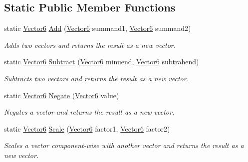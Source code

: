 \subsection*{Static Public Member Functions}
\begin{DoxyCompactItemize}
\item 
static \hyperlink{class_grid_framework_1_1_vectors_1_1_vector6}{Vector6} \hyperlink{class_grid_framework_1_1_vectors_1_1_vector6_aead346fb7cdcb61ac670495fe547db35_aead346fb7cdcb61ac670495fe547db35}{Add} (\hyperlink{class_grid_framework_1_1_vectors_1_1_vector6}{Vector6} summand1, \hyperlink{class_grid_framework_1_1_vectors_1_1_vector6}{Vector6} summand2)
\begin{DoxyCompactList}\small\item\em Adds two vectors and returns the result as a new vector.\end{DoxyCompactList}\item 
static \hyperlink{class_grid_framework_1_1_vectors_1_1_vector6}{Vector6} \hyperlink{class_grid_framework_1_1_vectors_1_1_vector6_afdccc269b1d2cc05b601f13bec6cf6c3_afdccc269b1d2cc05b601f13bec6cf6c3}{Subtract} (\hyperlink{class_grid_framework_1_1_vectors_1_1_vector6}{Vector6} minuend, \hyperlink{class_grid_framework_1_1_vectors_1_1_vector6}{Vector6} subtrahend)
\begin{DoxyCompactList}\small\item\em Subtracts two vectors and returns the result as a new vector.\end{DoxyCompactList}\item 
static \hyperlink{class_grid_framework_1_1_vectors_1_1_vector6}{Vector6} \hyperlink{class_grid_framework_1_1_vectors_1_1_vector6_a9c64543e1963092f36376d07105a69cc_a9c64543e1963092f36376d07105a69cc}{Negate} (\hyperlink{class_grid_framework_1_1_vectors_1_1_vector6}{Vector6} value)
\begin{DoxyCompactList}\small\item\em Negates a vector and returns the result as a new vector.\end{DoxyCompactList}\item 
static \hyperlink{class_grid_framework_1_1_vectors_1_1_vector6}{Vector6} \hyperlink{class_grid_framework_1_1_vectors_1_1_vector6_aed5217185ac89f4ce93477ec9b5c752b_aed5217185ac89f4ce93477ec9b5c752b}{Scale} (\hyperlink{class_grid_framework_1_1_vectors_1_1_vector6}{Vector6} factor1, \hyperlink{class_grid_framework_1_1_vectors_1_1_vector6}{Vector6} factor2)
\begin{DoxyCompactList}\small\item\em Scales a vector component-\/wise with another vector and returns the result as a new vector.\end{DoxyCompactList}\item 

\end{DoxyCompactItemize}
